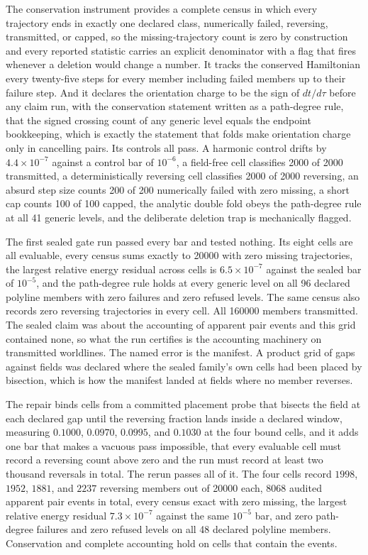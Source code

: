 \documentclass[aps,pre,reprint,nofootinbib,floatfix]{revtex4-2}
\begin{document}
The conservation instrument provides a complete census in which every
trajectory ends in exactly one declared class, numerically failed,
reversing, transmitted, or capped, so the missing-trajectory count is
zero by construction and every reported statistic carries an explicit
denominator with a flag that fires whenever a deletion would change a
number.  It tracks the conserved Hamiltonian every twenty-five steps
for every member including failed members up to their failure step.
And it declares the orientation charge to be the sign of $dt/d\tau$
before any claim run, with the conservation statement written as a
path-degree rule, that the signed crossing count of any generic level
equals the endpoint bookkeeping, which is exactly the statement that
folds make orientation charge only in cancelling pairs.  Its controls
all pass.  A harmonic control drifts by $4.4 \times 10^{-7}$ against a
control bar of $10^{-6}$, a field-free cell classifies 2000 of 2000
transmitted, a deterministically reversing cell classifies 2000 of 2000
reversing, an absurd step size counts 200 of 200 numerically failed
with zero missing, a short cap counts 100 of 100 capped, the analytic
double fold obeys the path-degree rule at all 41 generic levels, and
the deliberate deletion trap is mechanically flagged.

The first sealed gate run passed every bar and tested nothing.  Its
eight cells are all evaluable, every census sums exactly to 20000 with
zero missing trajectories, the largest relative energy residual across
cells is $6.5 \times 10^{-7}$ against the sealed bar of $10^{-5}$, and
the path-degree rule holds at every generic level on all 96 declared
polyline members with zero failures and zero refused levels.  The same
census also records zero reversing trajectories in every cell.  All
160000 members transmitted.  The sealed claim was about the accounting
of apparent pair events and this grid contained none, so what the run
certifies is the accounting machinery on transmitted worldlines.  The
named error is the manifest.  A product grid of gaps against fields was
declared where the sealed family's own cells had been placed by
bisection, which is how the manifest landed at fields where no member
reverses.

The repair binds cells from a committed placement probe that bisects
the field at each declared gap until the reversing fraction lands
inside a declared window, measuring $0.1000$, $0.0970$, $0.0995$, and
$0.1030$ at the four bound cells, and it adds one bar that makes a
vacuous pass impossible, that every evaluable cell must record a
reversing count above zero and the run must record at least two
thousand reversals in total.  The rerun passes all of it.  The four
cells record $1998$, $1952$, $1881$, and $2237$ reversing members out
of 20000 each, 8068 audited apparent pair events in total, every census
exact with zero missing, the largest relative energy residual
$7.3 \times 10^{-7}$ against the same $10^{-5}$ bar, and zero
path-degree failures and zero refused levels on all 48 declared
polyline members.  Conservation and complete accounting hold on cells
that contain the events.
\end{document}
